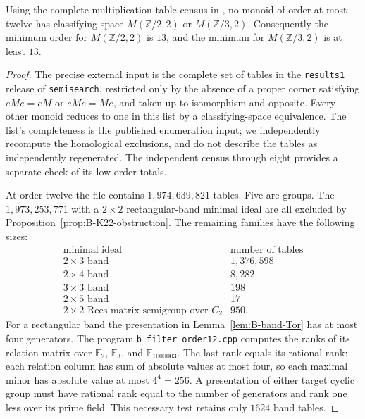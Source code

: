 \begin{proposition}
\label{prop:B-Moore-minimum}
Using the complete multiplication-table census in
\cite{SweeneyEnumeration2026B}, no monoid of order at most twelve
has classifying space $M(\mathbb Z/2,2)$ or $M(\mathbb Z/3,2)$.
Consequently the minimum order for $M(\mathbb Z/2,2)$ is $13$,
and the minimum for $M(\mathbb Z/3,2)$ is at least $13$.
\end{proposition}
\begin{proof}
The precise external input is the complete set of tables in the
\texttt{results1} release of \texttt{semisearch}, restricted only by
the absence of a proper corner satisfying $eMe=eM$ or $eMe=Me$,
and taken up to isomorphism and opposite.  Every other monoid reduces
to one in this list by a classifying-space equivalence.  The list's
completeness is the published enumeration input; we independently
recompute the homological exclusions, and do not describe the tables
as independently regenerated.  The independent census through eight
provides a separate check of its low-order totals.

At order twelve the file contains $1,974,639,821$ tables.
Five are groups.  The $1,973,253,771$ with a $2\times2$
rectangular-band minimal ideal are all excluded by
Proposition~\ref{prop:B-K22-obstruction}.  The remaining families
have the following sizes:
\[
\begin{array}{c|r}
\text{minimal ideal}&\text{number of tables}\\\hline
2\times3\text{ band}&1,376,598\\
2\times4\text{ band}&8,282\\
3\times3\text{ band}&198\\
2\times5\text{ band}&17\\
2\times2\text{ Rees matrix semigroup over }C_2&950.
\end{array}
\]
For a rectangular band the presentation in
Lemma~\ref{lem:B-band-Tor} has at most four generators.  The program
\texttt{b\_filter\_order12.cpp} computes the ranks of its relation
matrix over $\mathbb F_2$, $\mathbb F_3$, and
$\mathbb F_{1000003}$.  The last rank equals its rational rank:
each relation column has sum of absolute values at most four, so
each maximal minor has absolute value at most $4^4=256$.
A presentation of either target cyclic group must have rational rank
equal to the number of generators and rank one less over its prime
field.  This necessary test retains only $1624$ band tables.


\end{proof}
